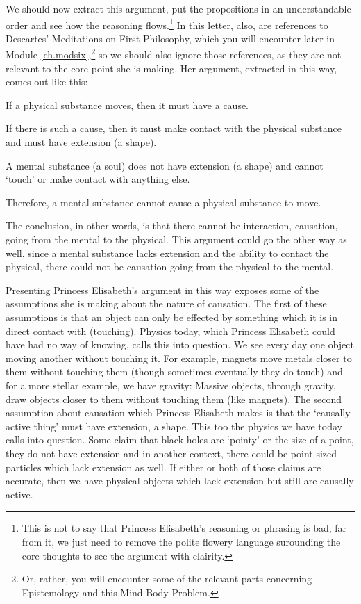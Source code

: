 We should now extract this argument, put the propositions in an understandable order and see how the reasoning flows.\footnote{This is not to say that Princess Elisabeth's reasoning or phrasing is bad, far from it, we just need to remove the polite flowery language surounding the core thoughts to see the argument with clairity.} In this letter, also, are references to Descartes' Meditations on First Philosophy, which you will encounter later in Module \ref{ch.modsix},\footnote{Or, rather, you will encounter some of the relevant parts concerning Epistemology and this Mind-Body Problem.} so we should also ignore those references, as they are not relevant to the core point she is making. Her argument, extracted in this way, comes out like this:

\begin{earg}
     \item[1 ] If a physical substance moves, then it must have a cause.
     \item[2 ] If there is such a cause, then it must make contact with the physical substance and must have extension (a shape).
     \item[3 ] A mental substance (a soul) does not have extension (a shape) and cannot `touch' or make contact with anything else.
     \item[4 ] Therefore, a mental substance cannot cause a physical substance to move.
\end{earg}

The conclusion, in other words, is that there cannot be interaction, causation, going from the mental to the physical. This argument could go the other way as well, since a mental substance lacks extension and the ability to contact the physical, there could not be causation going from the physical to the mental. 

Presenting Princess Elisabeth's argument in this way exposes some of the assumptions she is making about the nature of causation. The first of these assumptions is that an object can only be effected by something which it is in direct contact with (touching). Physics today, which Princess Elisabeth could have had no way of knowing, calls this into question. We see every day one object moving another without touching it. For example, magnets move metals closer to them without touching them (though sometimes eventually they do touch) and for a more stellar example, we have gravity: Massive objects, through gravity, draw objects closer to them without touching them (like magnets). The second assumption about causation which Princess Elisabeth makes is that the `causally active thing' must have extension, a shape. This too the physics we have today calls into question. Some claim that black holes are `pointy' or the size of a point, they do not have extension and in another context, there could be point-sized particles which lack extension as well. If either or both of those claims are accurate, then we have physical objects which lack extension but still are causally active. 

